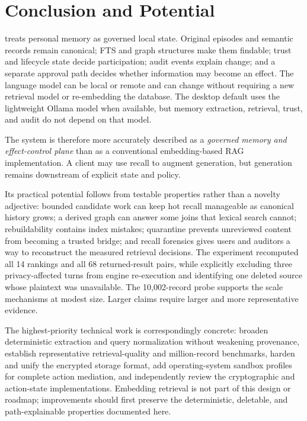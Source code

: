 \section{Conclusion and Potential}
\label{sec:conclusion}

\system{} treats personal memory as governed local state. Original episodes and semantic records remain canonical; FTS and graph structures make them findable; trust and lifecycle state decide participation; audit events explain change; and a separate approval path decides whether information may become an effect. The language model can be local or remote and can change without requiring a new retrieval model or re-embedding the database. The desktop default uses the lightweight  Ollama model when available, but memory extraction, retrieval, trust, and audit do not depend on that model.

The system is therefore more accurately described as a \emph{governed memory and effect-control plane} than as a conventional embedding-based RAG implementation. A client may use recall to augment generation, but generation remains downstream of explicit state and policy.

Its practical potential follows from testable properties rather than a novelty adjective: bounded candidate work can keep hot recall manageable as canonical history grows; a derived graph can answer some joins that lexical search cannot; rebuildability contains index mistakes; quarantine prevents unreviewed content from becoming a trusted bridge; and recall forensics gives users and auditors a way to reconstruct the measured retrieval decisions. The experiment recomputed all 14 rankings and all 68 returned-result pairs, while explicitly excluding three privacy-affected turns from engine re-execution and identifying one deleted source whose plaintext was unavailable. The 10,002-record probe supports the scale mechanisms at modest size. Larger claims require larger and more representative evidence.

The highest-priority technical work is correspondingly concrete: broaden deterministic extraction and query normalization without weakening provenance, establish representative retrieval-quality and million-record benchmarks, harden and unify the encrypted storage format, add operating-system sandbox profiles for complete action mediation, and independently review the cryptographic and action-state implementations. Embedding retrieval is not part of this design or roadmap; improvements should first preserve the deterministic, deletable, and path-explainable properties documented here.

